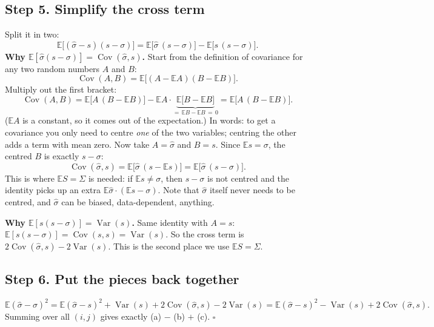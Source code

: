 \documentclass[12pt]{article}
\begin{document}
\subsection*{Step 5. Simplify the cross term}
Split it in two:
\[
\mathbb{E}\big[(\hat\sigma-s)(s-\sigma)\big]=\mathbb{E}\big[\hat\sigma\,(s-\sigma)\big]-\mathbb{E}\big[s\,(s-\sigma)\big].
\]
\textbf{Why $\mathbb{E}[\hat\sigma(s-\sigma)]=\operatorname{Cov}(\hat\sigma,s)$.} Start from the definition of covariance
for any two random numbers $A$ and $B$:
\[
\operatorname{Cov}(A,B)=\mathbb{E}\big[(A-\mathbb{E}A)(B-\mathbb{E}B)\big].
\]
Multiply out the first bracket:
\[
\operatorname{Cov}(A,B)=\mathbb{E}\big[A\,(B-\mathbb{E}B)\big]-\mathbb{E}A\cdot\underbrace{\mathbb{E}\big[B-\mathbb{E}B\big]}_{=\,\mathbb{E}B-\mathbb{E}B\,=\,0}
=\mathbb{E}\big[A\,(B-\mathbb{E}B)\big].
\]
($\mathbb{E}A$ is a constant, so it comes out of the expectation.) In words: to get a covariance you only
need to centre \emph{one} of the two variables; centring the other adds a term with mean zero.
Now take $A=\hat\sigma$ and $B=s$. Since $\mathbb{E}s=\sigma$, the centred $B$ is exactly $s-\sigma$:
\[
\operatorname{Cov}(\hat\sigma,s)=\mathbb{E}\big[\hat\sigma\,(s-\mathbb{E}s)\big]=\mathbb{E}\big[\hat\sigma\,(s-\sigma)\big].
\]
This is where $\mathbb{E}S=\Sigma$ is needed: if $\mathbb{E}s\neq\sigma$, then $s-\sigma$ is not centred and the
identity picks up an extra $\mathbb{E}\hat\sigma\cdot(\mathbb{E}s-\sigma)$. Note that $\hat\sigma$ itself never needs to be
centred, and $\hat\sigma$ can be biased, data-dependent, anything.

\textbf{Why $\mathbb{E}[s(s-\sigma)]=\operatorname{Var}(s)$.} Same identity with $A=s$:
$\mathbb{E}[s(s-\sigma)]=\operatorname{Cov}(s,s)=\operatorname{Var}(s)$.
So the cross term is $2\operatorname{Cov}(\hat\sigma,s)-2\operatorname{Var}(s)$. This is the second place we use $\mathbb{E}S=\Sigma$.

\subsection*{Step 6. Put the pieces back together}
\[
\mathbb{E}(\hat\sigma-\sigma)^2
=\mathbb{E}(\hat\sigma-s)^2+\operatorname{Var}(s)+2\operatorname{Cov}(\hat\sigma,s)-2\operatorname{Var}(s)
=\mathbb{E}(\hat\sigma-s)^2-\operatorname{Var}(s)+2\operatorname{Cov}(\hat\sigma,s).
\]
Summing over all $(i,j)$ gives exactly (a) $-$ (b) $+$ (c). \hfill$\square$
\end{document}
